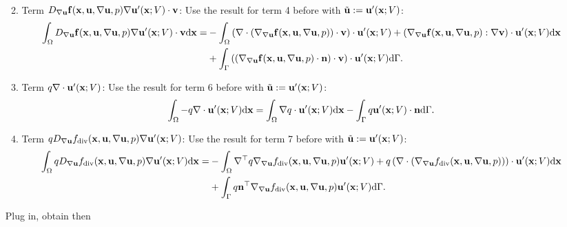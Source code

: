 \documentclass[oneside]{book}
\numberwithin{equation}{section}
\begin{document}
\begin{enumerate}[leftmargin=0in]
\begin{enumerate}[leftmargin=0in]
\begin{align*}
        \end{align*}
        \item Term $D_{\nabla{\bf u}}{\bf f}({\bf x},{\bf u},\nabla{\bf u},p)\nabla{\bf u}'({\bf x};V)\cdot{\bf v}$: Use the result for term 4 before with $\tilde{\bf u} := {\bf u}'({\bf x};V)$:
        \begin{align*}
            \int_\Omega D_{\nabla{\bf u}}{\bf f}({\bf x},{\bf u},\nabla{\bf u},p)\nabla{\bf u}'({\bf x};V)\cdot{\bf v}{\rm d}{\bf x} =& -\int_\Omega \left(\nabla\cdot\left(\nabla_{\nabla{\bf u}}{\bf f}({\bf x},{\bf u},\nabla{\bf u},p)\right)\cdot{\bf v}\right)\cdot{\bf u}'({\bf x};V) + \left(\nabla_{\nabla{\bf u}}{\bf f}({\bf x},{\bf u},\nabla{\bf u},p):\nabla{\bf v}\right)\cdot{\bf u}'({\bf x};V){\rm d}{\bf x}\\
            &+ \int_\Gamma \left(\left(\nabla_{\nabla{\bf u}}{\bf f}({\bf x},{\bf u},\nabla{\bf u},p)\cdot{\bf n}\right)\cdot{\bf v}\right)\cdot{\bf u}'({\bf x};V){\rm d}\Gamma.
        \end{align*}
        \item Term $q\nabla\cdot{\bf u}'({\bf x};V)$: Use the result for term 6 before with $\tilde{\bf u} := {\bf u}'({\bf x};V)$:
        \begin{align*}
            \int_\Omega -q\nabla\cdot{\bf u}'({\bf x};V){\rm d}{\bf x} = \int_\Omega \nabla q\cdot{\bf u}'({\bf x};V){\rm d}{\bf x} - \int_\Gamma q{\bf u}'({\bf x};V)\cdot{\bf n}{\rm d}\Gamma.
        \end{align*}
        \item Term $qD_{\nabla{\bf u}}f_{\rm div}({\bf x},{\bf u},\nabla{\bf u},p)\nabla{\bf u}'({\bf x};V)$: Use the result for term 7 before with $\tilde{\bf u} := {\bf u}'({\bf x};V)$:
        \begin{align*}
            \int_\Omega qD_{\nabla{\bf u}}f_{\rm div}({\bf x},{\bf u},\nabla{\bf u},p)\nabla{\bf u}'({\bf x};V){\rm d}{\bf x} =& -\int_\Omega \nabla^\top q\nabla_{\nabla{\bf u}}f_{\rm div}({\bf x},{\bf u},\nabla{\bf u},p){\bf u}'({\bf x};V) + q\left(\nabla\cdot\left(\nabla_{\nabla{\bf u}}f_{\rm div}({\bf x},{\bf u},\nabla{\bf u},p)\right)\right)\cdot{\bf u}'({\bf x};V){\rm d}{\bf x}\\
            &+ \int_\Gamma q{\bf n}^\top\nabla_{\nabla{\bf u}}f_{\rm div}({\bf x},{\bf u},\nabla{\bf u},p){\bf u}'({\bf x};V){\rm d}\Gamma.
        \end{align*}
    \end{enumerate}
    Plug in, obtain then
    \begin{equation*}

\end{equation*}
\end{enumerate}
\end{document}
